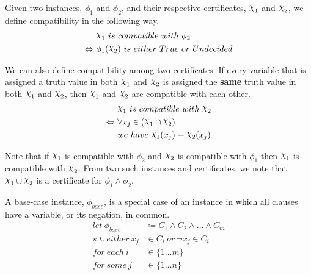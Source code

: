 \begin{definition}[Compatibility]
\label{def:compatibility}
    Given two instances, $\phi_1$ and $\phi_2$, and their respective certificates, $\rchi_1$ and $\rchi_2$, we define compatibility in the following way.
    \begin{align*}
        & \rchi_1~ is~ compatible~ with~ \phi_2 \\
        \Leftrightarrow~ & \phi_1(\rchi_2)~ is~ either~ True~ or~ Undecided
    \end{align*}

    We can also define compatibility among two certificates.
    If every variable that is assigned a truth value in both $\rchi_1$ and $\rchi_2$ is assigned the \textbf{same} truth value in both $\rchi_1$ and $\rchi_2$, then $\rchi_1$ and $\rchi_2$ are compatible with each other.
    \begin{align*}
        & \rchi_1~ is~ compatible~ with~ \rchi_2 \\
        \Leftrightarrow~ & \forall x_j \in (\rchi_1 \cap \rchi_2) \\
        & we~ have~ \rchi_1(x_j) \equiv \rchi_2(x_j)
    \end{align*}
\end{definition}

Note that if $\rchi_1$ is compatible with $\phi_2$ and $\rchi_2$ is compatible with $\phi_1$ then $\rchi_1$ is compatible with $\rchi_2$.
From two such instances and certificates, we note that $\rchi_1 \cup \rchi_2$ is a certificate for $\phi_1 \land \phi_2$.

\begin{definition}
\label{def:base-case-instance}
    A base-case instance, $\phi_{base}$, is a special case of an instance in which all clauses have a variable, or its negation, in common.
    \begin{align*}
        let~ \phi_{base} & \coloneqq C_1 \land C_2 \land \ldots \land C_m \\
        s.t.~ either~ x_j & \in C_i~ or~ \lnot x_j \in C_i \\
        for~ each~ i & \in \{ 1 \dots m \} \\
        for~ some~ j & \in \{ 1 \dots n \}
    \end{align*}
\end{definition}

\begin{comment}
    Compatibility:
        Two certificates are compatible if there are no conflicts between their flattened versions.

    Applying a Certificate:
        Setting variables as per the certificate and following the resulting Cascade.

    Combining two certificates:
        Two certificates can be combined if they are compatible.
        The combined certificate is the union of assignments made by choice in either certificate.

\end{comment}
